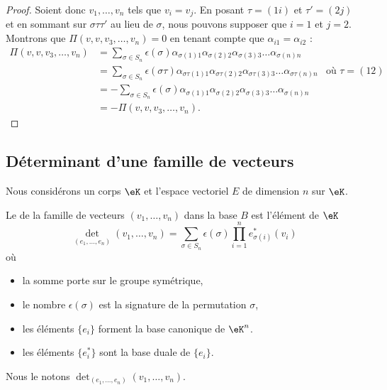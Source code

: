 \begin{proof}
    Soient donc \( v_1,\ldots, v_n\) tels que \( v_i=v_j\). En posant \( \tau=(1i)\) et \( \tau'=(2j)\) et en sommant sur \( \sigma\tau\tau'\) au lieu de \( \sigma\), nous pouvons supposer que \( i=1\) et \( j=2\). Montrons que \( \Pi(v,v,v_3,\ldots, v_n)=0\) en tenant compte que \( \alpha_{i1}=\alpha_{i2}\) :
    \begin{subequations}
        \begin{align}
            \Pi(v,v,v_3,\ldots, v_n)&=\sum_{\sigma\in S_n}\epsilon(\sigma)\alpha_{\sigma(1)1}\alpha_{\sigma(2)2}\alpha_{\sigma(3)3}\ldots \alpha_{\sigma(n)n}\\
            &=\sum_{\sigma\in S_n}\epsilon(\sigma\tau)\alpha_{\sigma\tau(1)1}\alpha_{\sigma\tau(2)2}\alpha_{\sigma\tau(3)3}\ldots \alpha_{\sigma\tau(n)n}&\text{où } \tau=(12)\\
            &=-\sum_{\sigma\in S_n}\epsilon(\sigma)\alpha_{\sigma(1)1}\alpha_{\sigma(2)2}\alpha_{\sigma(3)3}\ldots \alpha_{\sigma(n)n} \\
            &=-\Pi(v,v,v_3,\ldots, v_n).
        \end{align}
    \end{subequations}
\end{proof}

\subsection{Déterminant d'une famille de vecteurs}

Nous considérons un corps \( \eK\) et l'espace vectoriel \( E\) de dimension \( n\) sur \( \eK\).

\begin{definition}\label{DEFooODDFooSNahPb}
    Le  de la famille de vecteurs \( (v_1,\ldots, v_n)\) dans la base \( B\) est l'élément de \( \eK\)
    \begin{equation}        \label{EQooOJEXooXUpwfZ}
        \det_{(e_1,\ldots, e_n)}(v_1,\ldots, v_n)=\sum_{\sigma\in S_n}\epsilon(\sigma)\prod_{i=1}^ne^*_{\sigma(i)}(v_i)
    \end{equation}
    où 
    \begin{itemize}
        \item 
            la somme porte sur le groupe symétrique, 
        \item
            le nombre \( \epsilon(\sigma)\) est la signature de la permutation \( \sigma\),
        \item
            les éléments \( \{ e_i \}\) forment la base canonique de \( \eK^n\).
        \item
            les éléments \( \{ e^*_i \}\) sont la base duale de \( \{ e_i \}\).
    \end{itemize}
    Nous le notons \( \det_{(e_1,\ldots, e_n)}(v_1,\ldots, v_n)\).
\end{definition}


